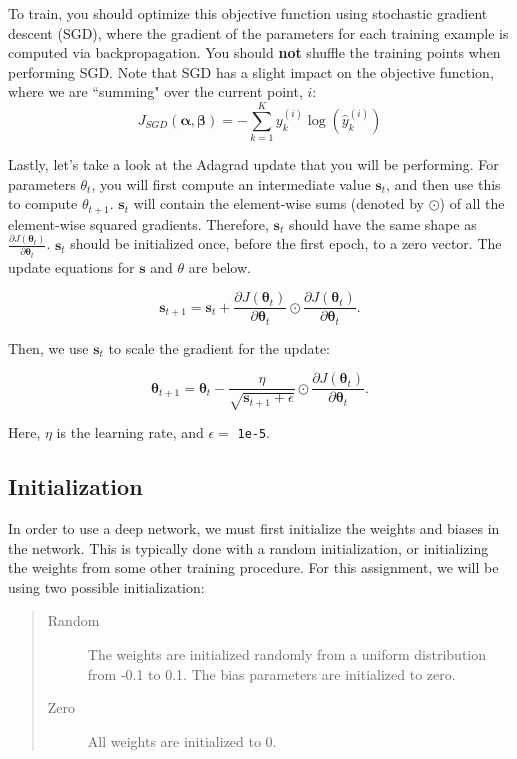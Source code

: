 \documentclass[11pt,addpoints,answers]{exam}
\newcommand{\sv}{\mathbf{s}}
\newcommand{\alphav     }{\boldsymbol \alpha     }
\newcommand{\betav      }{\boldsymbol \beta      }
\newcommand{\thetav     }{\boldsymbol \theta     }
\begin{document}
To train, you should optimize this objective function using stochastic gradient descent (SGD), where the gradient of the parameters for each training example is computed via backpropagation. You should \textbf{not} shuffle the training points when performing SGD. Note that SGD has a slight impact on the objective function, where we are ``summing" over the current point, $i$:
\begin{equation}
\label{eq:sgd_celoss}
J_{SGD}(\alphav, \betav)= -\sum_{k=1}^{K} y_k^{(i)} \log (\hat{y}^{(i)}_k)
\end{equation}

Lastly, let's take a look at the Adagrad update that you will be performing. For parameters $\theta_t$, you will first compute an intermediate value $\sv_t$, and then use this to compute $\theta_{t+1}$.
$\sv_t$ will contain the element-wise sums (denoted by $\odot$) of all the element-wise squared gradients. Therefore, $\sv_t$ should have the same shape as $\frac{\partial J(\thetav_{t})}{\partial \thetav_t}$. $\sv_t$ should be initialized once, before the first epoch, to a zero vector. The update equations for $\sv$ and $\theta$ are below.

\begin{equation}
    \label{eq:adagrad_s}
    \sv_{t+1} = \sv_{t} + \frac{\partial J(\thetav_{t})}{\partial \thetav_t} \odot \frac{\partial J(\thetav_{t})}{\partial \thetav_t}.
\end{equation}

Then, we use $\sv_t$ to scale the gradient for the update:

\begin{equation}
    \label{eq:adagrad_update}
    \thetav_{t+1} = \thetav_t - \frac{\eta}{\sqrt{\sv_{t+1} + \epsilon}} \odot \frac{\partial J(\thetav_t)}{ \partial \thetav_t}.
\end{equation}

Here, $\eta$ is the learning rate, and $\epsilon =$ \texttt{1e-5}.

\subsection{Initialization}
\label{sec:init}

In order to use a deep network, we must first initialize the weights and biases in the network. This is typically done with a random initialization, or initializing the weights from some other training procedure. For this assignment, we will be using two possible initialization: 
\begin{quote}
\begin{description}
\item[{\sc Random}] The weights are initialized randomly from a uniform distribution from -0.1 to 0.1. The bias parameters are initialized to zero.
\item[{\sc Zero}] All weights are initialized to 0.  
\end{description}
\end{quote}
\end{document}
